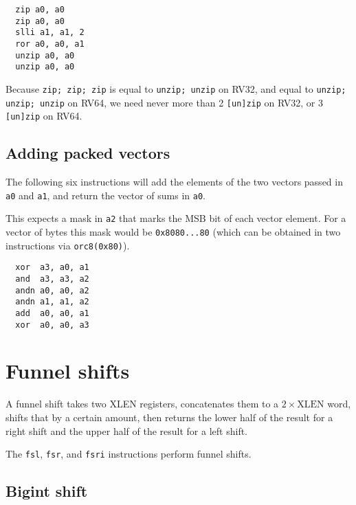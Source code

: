 \begin{minipage}{\linewidth}
\begin{verbatim}
  zip a0, a0
  zip a0, a0
  slli a1, a1, 2
  ror a0, a0, a1
  unzip a0, a0
  unzip a0, a0
\end{verbatim}
\end{minipage}

Because {\tt zip; zip; zip} is equal to {\tt unzip; unzip} on RV32,
and equal to {\tt unzip; unzip; unzip} on RV64, we need never more
than 2 {\tt [un]zip} on RV32, or 3 {\tt [un]zip} on RV64.


\subsection{Adding packed vectors}

The following six instructions will add the elements of the two vectors passed
in {\tt a0} and {\tt a1}, and return the vector of sums in {\tt a0}.

This expects a mask in {\tt a2} that marks the MSB bit of each vector
element. For a vector of bytes this mask would be {\tt 0x8080...80} (which
can be obtained in two instructions via {\tt orc8(0x80)}).

\begin{minipage}{\linewidth}
\begin{verbatim}
  xor  a3, a0, a1
  and  a3, a3, a2
  andn a0, a0, a2
  andn a1, a1, a2
  add  a0, a0, a1
  xor  a0, a0, a3
\end{verbatim}
\end{minipage}


\section{Funnel shifts}
\label{funnel}

A funnel shift takes two XLEN registers, concatenates them to a $2 \times
\textrm{XLEN}$ word, shifts that by a certain amount, then returns the lower
half of the result for a right shift and the upper half of the result for a
left shift.

The {\tt fsl}, {\tt fsr}, and {\tt fsri} instructions perform funnel shifts.

\subsection{Bigint shift}

